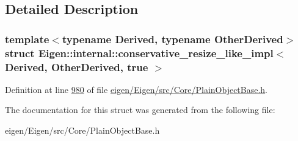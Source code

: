 \subsection{Detailed Description}
\subsubsection*{template$<$typename Derived, typename Other\+Derived$>$\newline
struct Eigen\+::internal\+::conservative\+\_\+resize\+\_\+like\+\_\+impl$<$ Derived, Other\+Derived, true $>$}



Definition at line \hyperlink{eigen_2_eigen_2src_2_core_2_plain_object_base_8h_source_l00980}{980} of file \hyperlink{eigen_2_eigen_2src_2_core_2_plain_object_base_8h_source}{eigen/\+Eigen/src/\+Core/\+Plain\+Object\+Base.\+h}.



The documentation for this struct was generated from the following file\+:\begin{DoxyCompactItemize}
\item 
eigen/\+Eigen/src/\+Core/\+Plain\+Object\+Base.\+h\end{DoxyCompactItemize}
